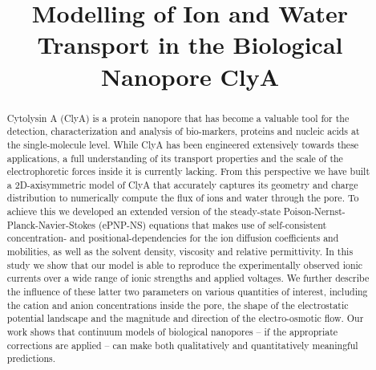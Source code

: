 \documentclass[journal=ancac3,manuscript=article,etalmode=truncate,maxauthors=0,layout=twocolumn]{achemso}
\title{Modelling of Ion and Water Transport in the Biological Nanopore ClyA}
\begin{document}
\begin{tocentry}
\end{tocentry}

\begin{abstract}
\footnotesize
Cytolysin A (ClyA) is a protein nanopore that has become a valuable tool for the detection, characterization
and analysis of bio-markers, proteins and nucleic acids at the single-molecule level. While ClyA has been
engineered extensively towards these applications, a full understanding of its transport properties and the
scale of the electrophoretic forces inside it is currently lacking. From this perspective we have built a
2D-axisymmetric model of ClyA that accurately captures its geometry and charge distribution to numerically
compute the flux of ions and water through the pore. To achieve this we developed an extended version of the
steady-state Poison-Nernst-Planck-Navier-Stokes (ePNP-NS) equations that makes use of self-consistent
concentration- and positional-dependencies for the ion diffusion coefficients and mobilities, as well as the
solvent density, viscosity and relative permittivity. In this study we show that our model is able to reproduce the experimentally observed ionic currents over a wide range of ionic strengths and applied voltages. We further describe the influence of these latter two parameters on various quantities of interest, including the cation and anion concentrations inside the pore, the shape of the electrostatic potential landscape and the magnitude and direction of the electro-osmotic flow. Our work shows that continuum models of biological nanopores -- if the appropriate corrections are applied -- can make both qualitatively and quantitatively meaningful predictions.
\end{abstract}


\end{document}
